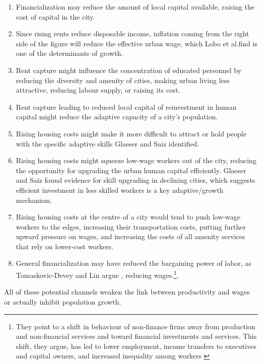 \begin{enumerate}
\item Financialization may reduce the amount of local capital available, raising the cost of capital in the city. 
    
\item Since rising rents reduce disposable income, inflation coming from the right side of the figure will reduce the effective urban wage, which Lobo et al.find is one of the determinants of growth.

\item Rent capture might influence the concentration of educated personnel by reducing the diversity and amenity of cities, making urban living less attractive, reducing labour supply, or raising its cost.

\item Rent capture leading to reduced local capital of reinvestment in human capital might reduce the adaptive capacity of a city's population.

\item Rising housing costs might make it more difficult to attract or hold people with the specific adaptive skills Glaeser and Saiz identified.

\item  Rising housing costs might squeeze low-wage workers out of the city, reducing the opportunity for upgrading the urban human capital efficiently. Glaeser and Saiz found evidence for skill upgrading in declining cities, which suggests efficient investment in less skilled workers is a key adaptive/growth mechanism. 

\item Rising housing costs at the centre of a city would tend to push low-wage workers to the edges, increasing their transportation costs, putting further upward pressure on wages, and increasing the costs of all amenity services that rely on lower-cost workers.

\item General financialization may have reduced the bargaining power of labor, as Tomaskovic-Devey and Lin argue \cite{tomaskovic-deveyFinancializationCausesInequality2013}, reducing wages.\footnote{They point to a shift in behaviour of non-finance firms away from production and non-financial services and toward financial investments and services. This shift, they argue,  has led to lower employment, income transfers to executives and capital owners, and increased inequality among workers \cite{tomaskovic-deveyFinancializationCausesInequality2013}}.
\end{enumerate}
All of these potential channels weaken the link between productivity and wages or actually inhibit population growth.


